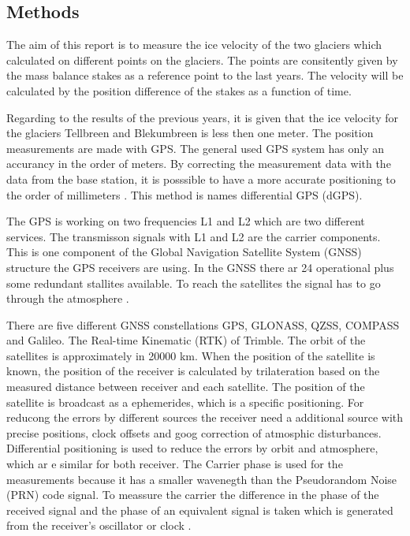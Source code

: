 
\subsection{Methods}\label{GPS:subsec:methods}

The aim of this report is to measure the ice velocity of the two glaciers which calculated on different points on the glaciers. 
The points are consitently given by the mass balance stakes as a reference point to the last years.
The velocity will be calculated by the position difference of the stakes as a function of time.

Regarding to the results of the previous years, it is given that the ice velocity for the glaciers Tellbreen and Blekumbreen is less then one meter.
The position measurements are made with GPS. 
The general used GPS system has only an accurancy in the order of meters.
By correcting the measurement data with the data from the base station, it is posssible to have a more accurate positioning to the order of millimeters \citep{UGPS}. This method is names differential GPS (dGPS).
\medskip

The GPS is working on two frequencies L1 and L2 which are two different services.
The transmisson signals with L1 and L2 are the carrier components. 
This is one component of the Global Navigation Satellite System (GNSS) structure the GPS receivers are using.
In the GNSS there ar 24 operational plus some redundant stallites available.
To reach the satellites the signal has to go through the atmosphere \citep{curcherdgps}.
\medskip

There are five different GNSS constellations GPS, GLONASS, QZSS, COMPASS and Galileo.
The Real-time Kinematic (RTK) of Trimble.
The orbit of the satellites is approximately in 20000 km.
When the position of the satellite is known, the position of the receiver is calculated by trilateration based on the measured distance between receiver and each satellite.
The position of the satellite is broadcast as a ephemerides, which is a specific positioning.
For reducong the errors by different sources the receiver need a additional source with precise positions, clock offsets and goog correction of atmosphic disturbances. 
Differential positioning is used to reduce the errors by orbit and atmosphere, which ar e similar for both receiver. 
The Carrier phase is used for the measurements because it has a smaller wavenegth than the Pseudorandom Noise (PRN) code signal.
To meassure the carrier the difference in the phase of the received signal and the phase of an equivalent signal is taken which is generated from the receiver’s oscillator or clock \citep{Trprocess}.
\medskip

